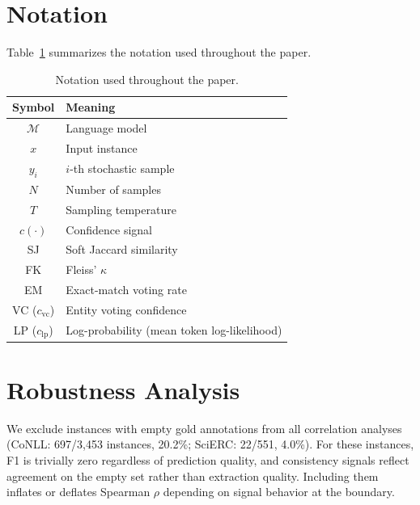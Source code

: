 \section{Notation}\label{app:notation}

Table~\ref{tab:notation} summarizes the notation used throughout the paper.

\begin{table}[h]
\centering
\small
\begin{tabular}{cl}
\toprule
Symbol & Meaning \\
\midrule
$\mathcal{M}$ & Language model \\
$x$ & Input instance \\
$y_i$ & $i$-th stochastic sample \\
$N$ & Number of samples \\
$T$ & Sampling temperature \\
$c(\cdot)$ & Confidence signal \\
SJ & Soft Jaccard similarity \\
FK & Fleiss' $\kappa$ \\
EM & Exact-match voting rate \\
VC ($c_{\mathrm{vc}}$) & Entity voting confidence \\
LP ($c_{\mathrm{lp}}$) & Log-probability (mean token log-likelihood) \\
\bottomrule
\end{tabular}
\caption{Notation used throughout the paper.}
\label{tab:notation}
\end{table}

\section{Robustness Analysis}\label{app:robustness}

We exclude instances with empty gold annotations from all correlation analyses (CoNLL: 697/3{,}453 instances, 20.2\%; SciERC: 22/551, 4.0\%).
For these instances, F1 is trivially zero regardless of prediction quality, and consistency signals reflect agreement on the empty set rather than extraction quality. Including them inflates or deflates Spearman $\rho$ depending on signal behavior at the boundary.

